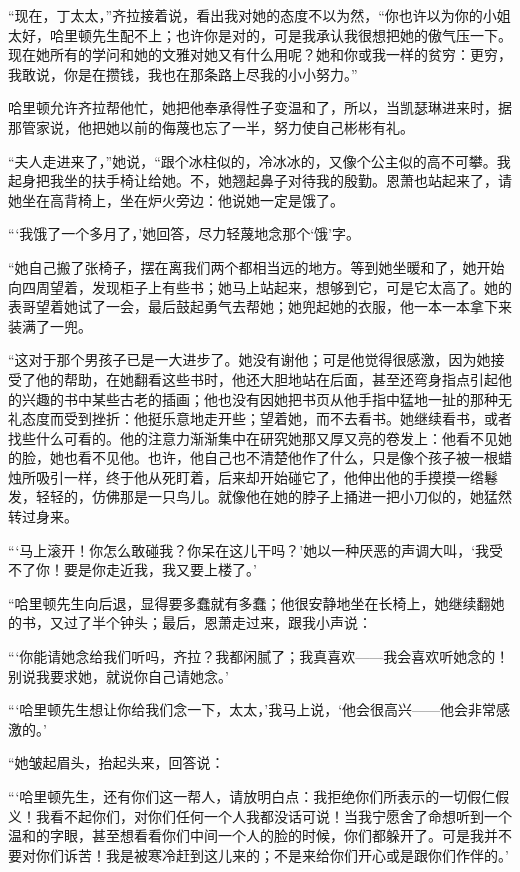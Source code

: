 \par “现在，丁太太，”齐拉接着说，看出我对她的态度不以为然，“你也许以为你的小姐太好，哈里顿先生配不上；也许你是对的，可是我承认我很想把她的傲气压一下。现在她所有的学问和她的文雅对她又有什么用呢？她和你或我一样的贫穷：更穷，我敢说，你是在攒钱，我也在那条路上尽我的小小努力。”
\par 哈里顿允许齐拉帮他忙，她把他奉承得性子变温和了，所以，当凯瑟琳进来时，据那管家说，他把她以前的侮蔑也忘了一半，努力使自己彬彬有礼。
\par “夫人走进来了，”她说，“跟个冰柱似的，冷冰冰的，又像个公主似的高不可攀。我起身把我坐的扶手椅让给她。不，她翘起鼻子对待我的殷勤。恩萧也站起来了，请她坐在高背椅上，坐在炉火旁边：他说她一定是饿了。
\par “‘我饿了一个多月了，’她回答，尽力轻蔑地念那个‘饿’字。
\par “她自己搬了张椅子，摆在离我们两个都相当远的地方。等到她坐暖和了，她开始向四周望着，发现柜子上有些书；她马上站起来，想够到它，可是它太高了。她的表哥望着她试了一会，最后鼓起勇气去帮她；她兜起她的衣服，他一本一本拿下来装满了一兜。
\par “这对于那个男孩子已是一大进步了。她没有谢他；可是他觉得很感激，因为她接受了他的帮助，在她翻看这些书时，他还大胆地站在后面，甚至还弯身指点引起他的兴趣的书中某些古老的插画；他也没有因她把书页从他手指中猛地一扯的那种无礼态度而受到挫折：他挺乐意地走开些；望着她，而不去看书。她继续看书，或者找些什么可看的。他的注意力渐渐集中在研究她那又厚又亮的卷发上：他看不见她的脸，她也看不见他。也许，他自己也不清楚他作了什么，只是像个孩子被一根蜡烛所吸引一样，终于他从死盯着，后来却开始碰它了，他伸出他的手摸摸一绺鬈发，轻轻的，仿佛那是一只鸟儿。就像他在她的脖子上捅进一把小刀似的，她猛然转过身来。
\par “‘马上滚开！你怎么敢碰我？你呆在这儿干吗？’她以一种厌恶的声调大叫，‘我受不了你！要是你走近我，我又要上楼了。’
\par “哈里顿先生向后退，显得要多蠢就有多蠢；他很安静地坐在长椅上，她继续翻她的书，又过了半个钟头；最后，恩萧走过来，跟我小声说：
\par “‘你能请她念给我们听吗，齐拉？我都闲腻了；我真喜欢——我会喜欢听她念的！别说我要求她，就说你自己请她念。’
\par “‘哈里顿先生想让你给我们念一下，太太，’我马上说，‘他会很高兴——他会非常感激的。’
\par “她皱起眉头，抬起头来，回答说：
\par “‘哈里顿先生，还有你们这一帮人，请放明白点：我拒绝你们所表示的一切假仁假义！我看不起你们，对你们任何一个人我都没话可说！当我宁愿舍了命想听到一个温和的字眼，甚至想看看你们中间一个人的脸的时候，你们都躲开了。可是我并不要对你们诉苦！我是被寒冷赶到这儿来的；不是来给你们开心或是跟你们作伴的。’
